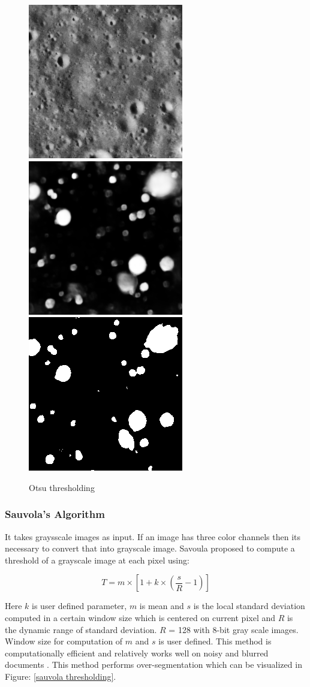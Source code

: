 \documentclass[11pt]{article}
\begin{document}
\begin{figure}[H]
	\includegraphics[width=.3\textwidth]{files/results/26.png}\hfill
	\includegraphics[width=.3\textwidth]{files/results/26_predict.png}\hfill
	\includegraphics[width=.3\textwidth]{files/results/otsu.png}
	\caption{Otsu thresholding}
	\label{otsu thresholding}
\end{figure}

\subsubsection{Sauvola's Algorithm}
It takes graysscale images as input. If an image has three color channels then its necessary to convert that into grayscale image. Savoula proposed to compute a threshold of a grayscale image at each pixel using:

\begin{equation}
T=m \times\left[1+k \times\left(\frac{s}{R}-1\right)\right]
\end{equation}

Here $k$ is user defined parameter, $m$ is mean and $s$ is the local standard deviation computed in a certain window size which is centered on current pixel and $R$ is the dynamic range of standard deviation. $R$ = 128 with 8-bit gray scale images. Window size for computation of $m$ and $s$ is user defined. This method is computationally efficient and relatively works well on noisy and blurred documents \cite{szegedy_going_2015}. This method performs over-segmentation which can be visualized in Figure: \ref{sauvola thresholding}.
\end{document}

